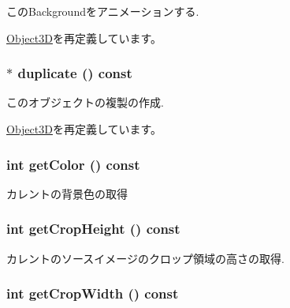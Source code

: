 このBackgroundをアニメーションする. 

\hyperlink{classm3g_1_1Object3D_8aad1ceab4c2a03609c8a42324ce484d}{Object3D}を再定義しています。\hypertarget{classm3g_1_1Background_f99eb943724fede230c51353bad6d453}{
\subsubsection[{duplicate}]{ $\ast$ duplicate () const}}
\label{classm3g_1_1Background_f99eb943724fede230c51353bad6d453}


このオブジェクトの複製の作成. 

\hyperlink{classm3g_1_1Object3D_a25110dac934f867b83b73ad4741a0f4}{Object3D}を再定義しています。\hypertarget{classm3g_1_1Background_4cfa1931c265ec3412fe3f6408a1b4f5}{
\subsubsection[{getColor}]{\setlength{\rightskip}{0pt plus 5cm}int getColor () const}}
\label{classm3g_1_1Background_4cfa1931c265ec3412fe3f6408a1b4f5}


カレントの背景色の取得 \hypertarget{classm3g_1_1Background_d6d9d6f23b7bb004c93642bcd081f4a3}{
\subsubsection[{getCropHeight}]{\setlength{\rightskip}{0pt plus 5cm}int getCropHeight () const}}
\label{classm3g_1_1Background_d6d9d6f23b7bb004c93642bcd081f4a3}


カレントのソースイメージのクロップ領域の高さの取得. \hypertarget{classm3g_1_1Background_5c6515f6706675ef31ca5dfa0a03b953}{
\subsubsection[{getCropWidth}]{\setlength{\rightskip}{0pt plus 5cm}int getCropWidth () const}}
\label{classm3g_1_1Background_5c6515f6706675ef31ca5dfa0a03b953}


